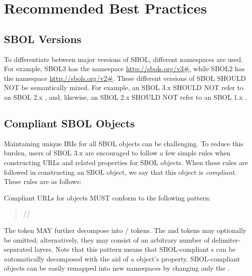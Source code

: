 \section{Recommended Best Practices}
\label{sec:bestpractices}
\subsection{SBOL Versions}

To differentiate between major versions of SBOL, different namespaces are used.  For example, SBOL3 has the namespace \url{http://sbols.org/v3#}, while SBOL2 has the namespace \url{http://sbols.org/v2#}.  These different versions of SBOL SHOULD NOT be semantically mixed. For example, an SBOL 3.x  SHOULD NOT refer to an SBOL 2.x , and, likewise, an SBOL 2.x  SHOULD NOT refer to an SBOL 1.x .

\subsection{Compliant SBOL Objects}
\label{sec:compliant}

Maintaining unique IRIs for all SBOL objects can be challenging.  To reduce this burden, users of SBOL 3.x are encouraged to follow a few simple rules when constructing URLs and related properties for SBOL objects.  When these rules are followed in constructing an SBOL object, we say that this object is \emph{compliant}. These rules are as follows:

Compliant URLs for  objects MUST conform to the following pattern:
\begin{quotation} 
//
\end{quotation}

The  token MAY further decompose into / tokens. The  and  tokens may optionally be omitted; alternatively, they may consist of an arbitrary number of delimiter-separated layers. Note that this pattern means that SBOL-compliant s can be automatically decomposed with the aid of a  object's  property. SBOL-compliant objects can be easily remapped into new namespaces by changing only the .

